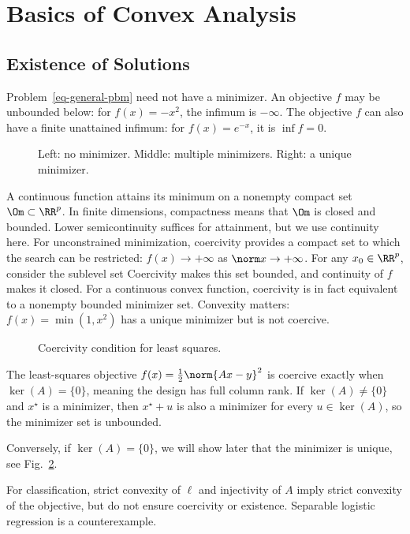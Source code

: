 \section{Basics of Convex Analysis}

                                                                                  
\subsection{Existence of Solutions}

Problem~\eqref{eq-general-pbm} need not have a minimizer. An objective $f$ may be unbounded below: for $f(x)=-x^2$, the infimum is $-\infty$. The objective $f$ can also have a finite unattained infimum: for $f(x)=e^{-x}$, it is $\inf f=0$.

\begin{figure}[tbp]
\centering
{}
\caption{Left: no minimizer. Middle: multiple minimizers. Right: a unique minimizer.}
\label{fig-minimizer-exists}
\end{figure}

A continuous function attains its minimum on a nonempty compact set $\Om\subset\RR^p$. In finite dimensions, compactness means that $\Om$ is closed and bounded. Lower semicontinuity suffices for attainment, but we use continuity here. For unconstrained minimization, coercivity provides a compact set to which the search can be restricted: $f(x) \rightarrow +\infty$ as $\norm x\rightarrow+\infty$. For any $x_0 \in \RR^p$, consider the sublevel set
Coercivity makes this set bounded, and continuity of $f$ makes it closed. For a continuous convex function, coercivity is in fact equivalent to a nonempty bounded minimizer set. Convexity matters: $f(x)=\min(1,x^2)$ has a unique minimizer but is not coercive.

\begin{figure}[tbp]
\centering
{}\hfill
{}
\caption{Coercivity condition for least squares.}
\label{fig-least-square}
\end{figure}

\begin{exmp}
The least-squares objective $f(x)=\frac{1}{2}\norm{Ax-y}^2$ is coercive exactly when $\ker(A)=\{0\}$, meaning the design has full column rank. If $\ker(A) \neq \{0\}$ and $x^\star$ is a minimizer, then $x^\star+u$ is also a minimizer for every $u \in \ker(A)$, so the minimizer set is unbounded.
 
Conversely, if $\ker(A) = \{0\}$, we will show later that the minimizer is unique, see Fig.~\ref{fig-least-square}.
 
For classification, strict convexity of $\ell$ and injectivity of $A$ imply strict convexity of the objective, but do not ensure coercivity or existence. Separable logistic regression is a counterexample.
\end{exmp}

